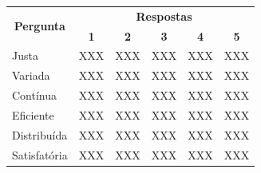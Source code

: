         \begin{table}[]
            \centering
            \label{table:5.1_Opiniao}
            \begin{tabular}{@{}|lccccc|@{}}
                \toprule
                \multicolumn{1}{|c|}{\multirow{2}{*}{\textbf{Pergunta}}} & \multicolumn{5}{c|}{\textbf{Respostas}}                                                                                                                          \\
                \multicolumn{1}{|c|}{}                                   & \multicolumn{1}{c|}{\textbf{1}} & \multicolumn{1}{c|}{\textbf{2}} & \multicolumn{1}{c|}{\textbf{3}} & \multicolumn{1}{c|}{\textbf{4}} & \textbf{5}               \\ \midrule
                Justa                                                    & XXX                             & XXX                             & XXX                             & XXX                             & XXX                      \\ \midrule
                Variada                                                  & XXX                             & XXX                             & XXX                             & XXX                             & XXX                      \\ \midrule
                Contínua                                                 & XXX                             & XXX                             & XXX                             & XXX                             & XXX                      \\ \midrule
                Eficiente                                                & \multicolumn{1}{l}{XXX}         & \multicolumn{1}{l}{XXX}         & \multicolumn{1}{l}{XXX}         & \multicolumn{1}{l}{XXX}         & \multicolumn{1}{l|}{XXX} \\ \midrule
                Distribuída                                              & \multicolumn{1}{l}{XXX}         & \multicolumn{1}{l}{XXX}         & \multicolumn{1}{l}{XXX}         & \multicolumn{1}{l}{XXX}         & \multicolumn{1}{l|}{XXX} \\ \midrule
                Satisfatória                                             & \multicolumn{1}{l}{XXX}         & \multicolumn{1}{l}{XXX}         & \multicolumn{1}{l}{XXX}         & \multicolumn{1}{l}{XXX}         & \multicolumn{1}{l|}{XXX} \\ \bottomrule
            \end{tabular}
        \end{table}

